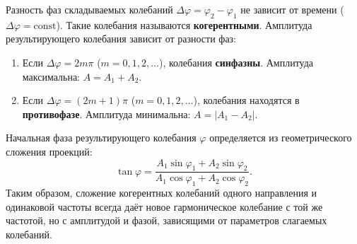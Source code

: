 \begin{property}
Разность фаз складываемых колебаний $\Delta\varphi = \varphi_2 - \varphi_1$ не зависит от времени ($\Delta\varphi = \text{const}$). Такие колебания называются \textbf{когерентными}. Амплитуда результирующего колебания зависит от разности фаз:
\begin{enumerate}
    \item Если $\Delta\varphi = 2m\pi$ ($m=0, 1, 2, \dots$), колебания \textbf{синфазны}. Амплитуда максимальна: $A = A_1 + A_2$.
    \item Если $\Delta\varphi = (2m+1)\pi$ ($m=0, 1, 2, \dots$), колебания находятся в \textbf{противофазе}. Амплитуда минимальна: $A = |A_1 - A_2|$.
\end{enumerate}
\end{property}

\begin{remark}
Начальная фаза результирующего колебания $\varphi$ определяется из геометрического сложения проекций:
\begin{equation}
    \tan\varphi = \frac{A_1 \sin\varphi_1 + A_2 \sin\varphi_2}{A_1 \cos\varphi_1 + A_2 \cos\varphi_2}.
\end{equation}
Таким образом, сложение когерентных колебаний одного направления и одинаковой частоты всегда даёт новое гармоническое колебание с той же частотой, но с амплитудой и фазой, зависящими от параметров слагаемых колебаний.
\end{remark}

\vspace{1cm}

